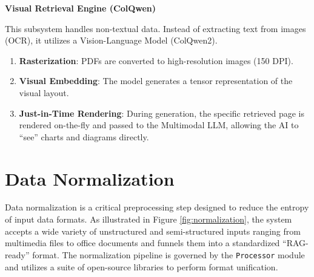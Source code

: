 \textbf{Visual Retrieval Engine (ColQwen)}

This subsystem handles non-textual data. Instead of extracting text from images (OCR), it utilizes a Vision-Language Model (ColQwen2).
\begin{enumerate}
    \item \textbf{Rasterization}: PDFs are converted to high-resolution images (150 DPI).
    \item \textbf{Visual Embedding}: The model generates a tensor representation of the visual layout.
    \item \textbf{Just-in-Time Rendering}: During generation, the specific retrieved page is rendered on-the-fly and passed to the Multimodal LLM, allowing the AI to ``see'' charts and diagrams directly.
\end{enumerate}



\section{Data Normalization}

Data normalization is a critical preprocessing step designed to reduce the entropy of input data formats. As illustrated in Figure \ref{fig:normalization}, the system accepts a wide variety of unstructured and semi-structured inputs ranging from multimedia files to office documents and funnels them into a standardized ``RAG-ready'' format.
The normalization pipeline is governed by the \texttt{Processor} module and utilizes a suite of open-source libraries to perform format unification.


